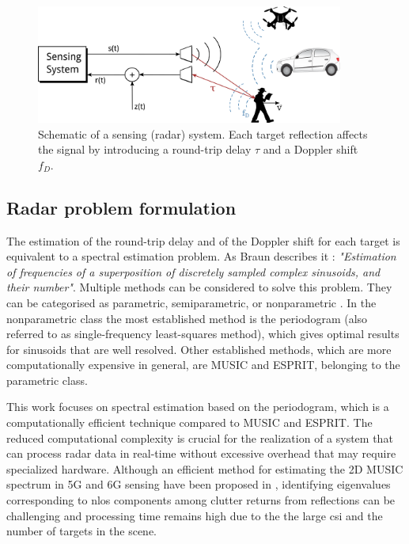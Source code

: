     \begin{figure}[t]
    	\centering
    	\includegraphics[width=0.9\textwidth]{Images/introduction/sensing_operation.png}
    	\caption{Schematic of a sensing (radar) system. Each target reflection affects the signal by introducing a round-trip delay $\tau$ and a Doppler shift $f_D$.}
    	\label{fig:sensing_operation}
    \end{figure}
    
    \subsection{Radar problem formulation}
    
    The estimation of the round-trip delay and of the Doppler shift for each target is equivalent to a spectral estimation problem. As Braun describes it \cite{Braun2014OFDMRA}: \textit{"Estimation of frequencies of a superposition of discretely sampled complex sinusoids, and their number"}.
    Multiple methods can be considered to solve this problem. They can be categorised as parametric, semiparametric, or nonparametric \cite{Stoica_New_Method_Parameter_Estimation}. 
    In the nonparametric class the most established method is the periodogram (also referred to as single-frequency least-squares method), which gives optimal results for sinusoids that are well resolved.
    Other established methods, which are more computationally expensive in general, are MUSIC and ESPRIT, belonging to the parametric class.
    
    \alert{This work focuses on spectral estimation based on the periodogram, which is a computationally efficient technique compared to MUSIC and ESPRIT.}
    The reduced computational complexity is crucial for the realization of a system that can process radar data in real-time without excessive overhead that may require specialized hardware.
    Although an efficient method for estimating the 2D MUSIC spectrum in 5G and 6G sensing have been proposed in \cite{Henninger_Mandelli_Arnold_EfficientMUSIC}, identifying eigenvalues corresponding to \gls{nlos} components among clutter returns from reflections can be challenging and processing time remains high due to the the large \gls{csi} and the number of targets in the scene.
    
